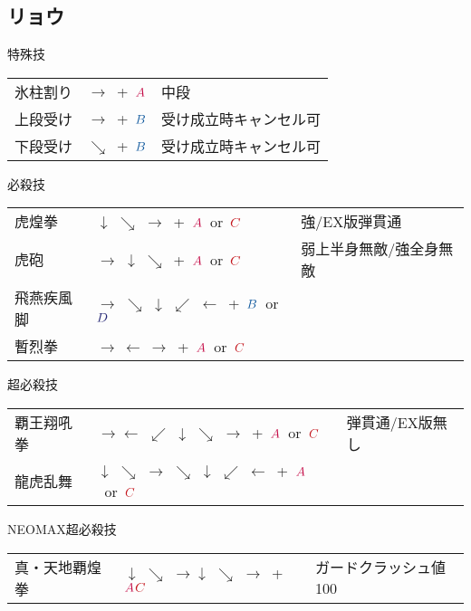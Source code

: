 \documentclass[a4j,11pt]{jarticle}
\def\A{$\textcolor{Acolor}{A}$}
\def\C{$\textcolor{Ccolor}{C}$}
\def\B{$\textcolor{Bcolor}{B}$}
\def\D{$\textcolor{Dcolor}{D}$}
\def\hado{$\downarrow$ $\searrow$ $\rightarrow$}%
\def\syoryu{$\rightarrow$ $\downarrow$ $\searrow$}%
\def\yoga{$\leftarrow$ $\swarrow$ $\downarrow$ $\searrow$ $\rightarrow$}%
\def\gyakuyoga{$\rightarrow$ $\searrow$ $\downarrow$ $\swarrow$ $\leftarrow$}%
\def\ryuko{$\downarrow$ $\searrow$ $\rightarrow$ $\searrow$ $\downarrow$ $\swarrow$ $\leftarrow$}%
\begin{document}
\subsection{リョウ}
\begin{itembox}[l]{特殊技}
\begin{tabular}{lll}
氷柱割り&$\rightarrow$\ +\ \A&中段\\%
上段受け&$\rightarrow$\ +\ \B&受け成立時キャンセル可\\%
下段受け&$\searrow$\ +\ \B&受け成立時キャンセル可%
\end{tabular}
\end{itembox}
\begin{itembox}[l]{必殺技}
\begin{tabular}{lll}
虎煌拳&\hado\ +\ \A\ or\ \C&強/EX版弾貫通\\%
虎砲&\syoryu\ +\ \A\ or\ \C&弱上半身無敵/強全身無敵\\%
飛燕疾風脚&\gyakuyoga\ +\ \B\ or\ \D&\\%
暫烈拳&$\rightarrow\ \leftarrow\ \rightarrow$\ +\ \A\ or\ \C&%
\end{tabular}
\end{itembox}
\begin{itembox}[l]{超必殺技}
\begin{tabular}{lll}
覇王翔吼拳&$\rightarrow$\yoga\ +\ \A\ or\ \C&弾貫通/EX版無し\\%
龍虎乱舞&\ryuko\ +\ \A\ or\ \C&%
\end{tabular}
\end{itembox}
\begin{itembox}[l]{NEOMAX超必殺技}
\begin{tabular}{lll}
真・天地覇煌拳&\hado\hado\ +\ \A\C&ガードクラッシュ値100%
\end{tabular}
\end{itembox}
\newpage
\end{document}
